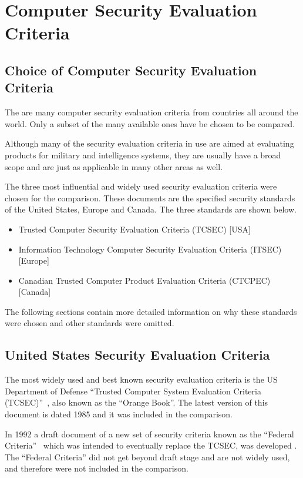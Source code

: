 \chapter{Computer Security Evaluation Criteria}

    \section{Choice of Computer Security Evaluation Criteria}
        The are many computer security evaluation criteria from countries
        all around the world. Only a subset of the many available ones have
        be chosen to be compared. 

        Although many of the security evaluation criteria in use are
        aimed at evaluating products for military and intelligence
        systems, they are usually have a broad scope and are just as
        applicable in many other areas as well.

        The three most influential and widely used security evaluation
        criteria were chosen for the comparison. These documents are
        the specified security standards of the United States, Europe
        and Canada. The three standards are shown below.
        \begin{itemize}
            \item Trusted Computer Security Evaluation Criteria (TCSEC) [USA]
            \item Information Technology Computer Security 
                  Evaluation Criteria (ITSEC) [Europe]
            \item Canadian Trusted Computer Product Evaluation Criteria
                  (CTCPEC) [Canada]
        \end{itemize}
        The following sections contain more detailed information on why these standards
        were chosen and other standards were omitted.

    \section{United States Security Evaluation Criteria}
        The most widely used and best known security evaluation criteria
        is the US Department of Defense ``Trusted Computer
        System Evaluation Criteria (TCSEC)''~\cite{orange}, also known as the 
        ``Orange Book''. The latest version of this document is dated
        1985 and it was included in the comparison. 

        In 1992 a draft document of a new set of security criteria known
        as the ``Federal Criteria''~\cite{federal} which was intended to eventually
        replace the TCSEC, was developed . The ``Federal Criteria'' did not get beyond
        draft stage and are not widely used, and therefore were not 
        included in the comparison.


